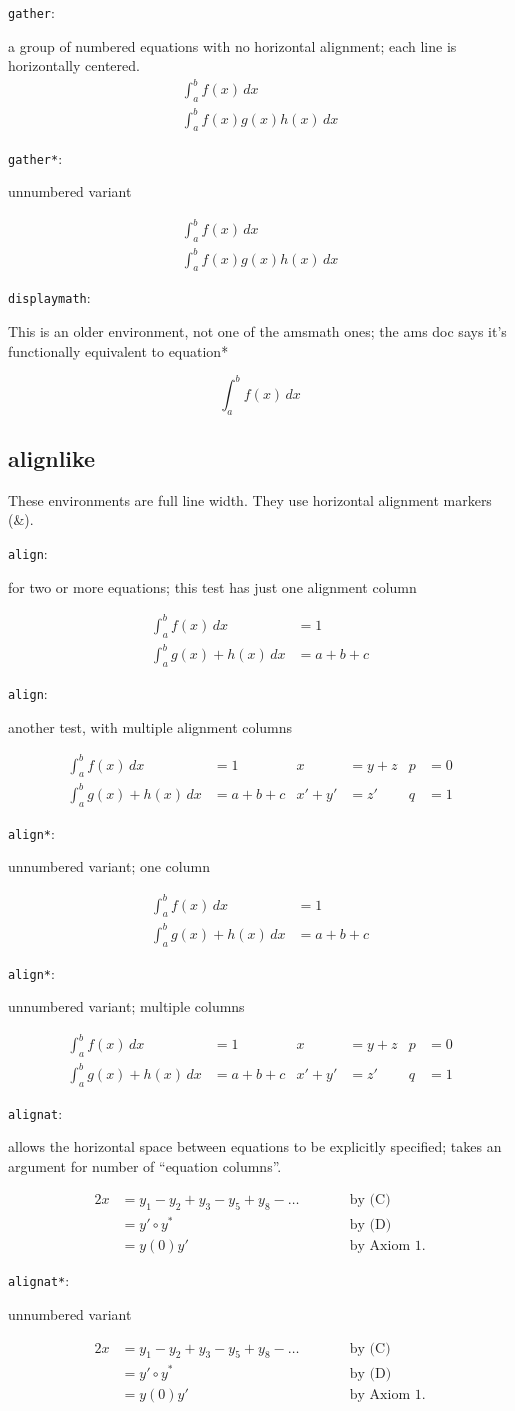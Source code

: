 \documentclass[leqno]{article}
\newcommand{\testtype}[2]{\texttt{#1}:%
  #2}
\newcommand{\makeoutertest}[3]{
  \begin{test}
    \testtype{#1}{#2}
    #3
  \end{test}
}
\newcommand{\maketest}[3]{
  \makeoutertest{#1}{#2}{
    \begin{#1}
      #3
    \end{#1}
  }
}
\begin{document}
\maketest{gather}{
  a group of numbered equations with no horizontal alignment; each line is horizontally centered.\\
}{
  \int_a^b f(x)\, dx\\
  \int_a^b f(x)g(x)h(x)\, dx
}
\maketest{gather*}{
  unnumbered variant
}{
  \int_a^b f(x)\, dx\\
  \int_a^b f(x)g(x)h(x)\, dx
}

\maketest{displaymath}{
  This is an older environment, not one of the amsmath ones; the ams doc says it's functionally equivalent to equation*
}{
  \int_a^b f(x)\, dx
}

\subsection{alignlike}
These environments are full line width.
They use horizontal alignment markers (\&).

\maketest{align}{
  for two or more equations; this test has just one alignment column
}{
  \int_a^b f(x)\, dx &= 1\\
  \int_a^b g(x) + h(x)\, dx &= a+b+c
}
\maketest{align}{
  another test, with multiple alignment columns
}{
  \int_a^b f(x)\, dx &= 1
  & x &= y+z
  & p &= 0\\
  \int_a^b g(x) + h(x)\, dx &= a+b+c
  & x'+y' &= z'
  & q &= 1
}
\maketest{align*}{
  unnumbered variant; one column
}{
  \int_a^b f(x)\, dx &= 1\\
  \int_a^b g(x) + h(x)\, dx &= a+b+c
}
\maketest{align*}{
  unnumbered variant; multiple columns
}{
  \int_a^b f(x)\, dx &= 1
  & x &= y+z
  & p &= 0\\
  \int_a^b g(x) + h(x)\, dx &= a+b+c
  & x'+y' &= z'
  & q &= 1
}
\makeoutertest{alignat}{
  allows the horizontal space between equations to be explicitly specified;
  takes an argument for number of ``equation columns''.
}{
  \begin{alignat}{2}
    x& = y_1-y_2+y_3-y_5+y_8-\dots
    &\qquad& \text{by (C)}\\
     & = y'\circ y^* && \text{by (D)}\\
     & = y(0) y' && \text {by Axiom 1.}
  \end{alignat}
}
\makeoutertest{alignat*}{
  unnumbered variant
}{
  \begin{alignat*}{2}
    x& = y_1-y_2+y_3-y_5+y_8-\dots
    &\qquad& \text{by (C)}\\
     & = y'\circ y^* && \text{by (D)}\\
     & = y(0) y' && \text {by Axiom 1.}
  \end{alignat*}
}
\end{document}
